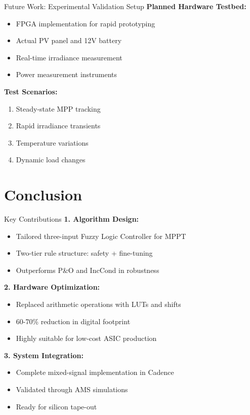 \documentclass[aspectratio=169,usenames,dvipsnames]{beamer}
\begin{document}
\begin{frame}{Future Work: Experimental Validation Setup}
    \textbf{Planned Hardware Testbed:}
    \begin{itemize}
        \item FPGA implementation for rapid prototyping
        \item Actual PV panel and 12V battery
        \item Real-time irradiance measurement
        \item Power measurement instruments
    \end{itemize}
    
    \vspace{0.3cm}
    \textbf{Test Scenarios:}
    \begin{enumerate}
        \item Steady-state MPP tracking
        \item Rapid irradiance transients
        \item Temperature variations
        \item Dynamic load changes
    \end{enumerate}
\end{frame}

\section{Conclusion}

\begin{frame}{Key Contributions}
    \textbf{1. Algorithm Design:}
    \begin{itemize}
        \item Tailored three-input Fuzzy Logic Controller for MPPT
        \item Two-tier rule structure: safety + fine-tuning
        \item Outperforms P\&O and IncCond in robustness
    \end{itemize}
    
    \vspace{0.2cm}
    \textbf{2. Hardware Optimization:}
    \begin{itemize}
        \item Replaced arithmetic operations with LUTs and shifts
        \item 60-70\% reduction in digital footprint
        \item Highly suitable for low-cost ASIC production
    \end{itemize}
    
    \vspace{0.2cm}
    \textbf{3. System Integration:}
    \begin{itemize}
        \item Complete mixed-signal implementation in Cadence
        \item Validated through AMS simulations
        \item Ready for silicon tape-out
    \end{itemize}
\end{frame}
\end{document}
